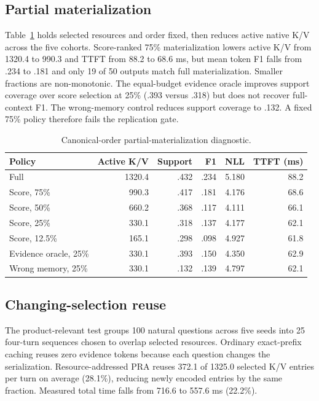 \documentclass[11pt]{article}
\begin{document}
\subsection{Partial materialization}
Table~\ref{tab:partial-materialization} holds selected resources and order
fixed, then reduces active native K/V across the five cohorts. Score-ranked
75\% materialization lowers active K/V from 1320.4 to 990.3 and TTFT from 88.2
to 68.6 ms, but mean token F1 falls from .234 to .181 and only 19 of 50 outputs
match full materialization. Smaller fractions are non-monotonic. The
equal-budget evidence oracle improves support coverage over score selection at
25\% (.393 versus .318) but does not recover full-context F1. The wrong-memory
control reduces support coverage to .132. A fixed 75\% policy therefore fails
the replication gate.

\begin{table}[ht]
\centering
\caption{Canonical-order partial-materialization diagnostic.}
\label{tab:partial-materialization}
\small
\begin{tabular}{lrrrrr}
\toprule
Policy & Active K/V & Support & F1 & NLL & TTFT (ms) \\
\midrule
Full & 1320.4 & .432 & .234 & 5.180 & 88.2 \\
Score, 75\% & 990.3 & .417 & .181 & 4.176 & 68.6 \\
Score, 50\% & 660.2 & .368 & .117 & 4.111 & 66.1 \\
Score, 25\% & 330.1 & .318 & .137 & 4.177 & 62.1 \\
Score, 12.5\% & 165.1 & .298 & .098 & 4.927 & 61.8 \\
Evidence oracle, 25\% & 330.1 & .393 & .150 & 4.350 & 62.9 \\
Wrong memory, 25\% & 330.1 & .132 & .139 & 4.797 & 62.1 \\
\bottomrule
\end{tabular}
\end{table}

\subsection{Changing-selection reuse}
The product-relevant test groups 100 natural questions across five seeds into
25 four-turn sequences chosen to overlap selected resources. Ordinary
exact-prefix caching reuses zero evidence tokens because each question changes
the serialization. Resource-addressed PRA reuses 372.1 of 1325.0 selected K/V
entries per turn on average (28.1\%), reducing newly encoded entries by the same
fraction. Measured total time falls from 716.6 to 557.6 ms (22.2\%).
\end{document}
